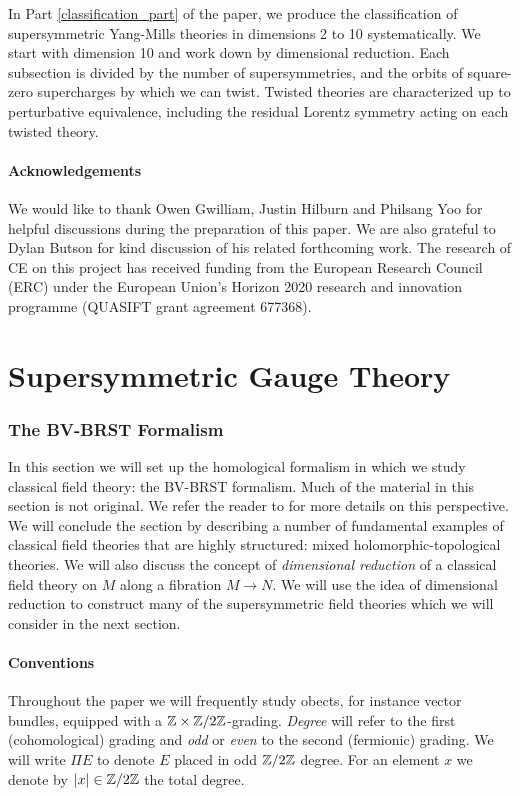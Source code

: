 \documentclass[10pt, oneside]{article}
\begin{document}
In Part \ref{classification_part} of the paper, we produce the classification of supersymmetric Yang-Mills theories in dimensions 2 to 10 systematically.  We start with dimension 10 and work down by dimensional reduction.  Each subsection is divided by the number of supersymmetries, and the orbits of square-zero supercharges by which we can twist.  Twisted theories are characterized up to perturbative equivalence, including the residual Lorentz symmetry acting on each twisted theory.

\subsection*{Acknowledgements}
We would like to thank Owen Gwilliam, Justin Hilburn and Philsang Yoo for helpful discussions during the preparation of this paper.  We are also grateful to Dylan Butson for kind discussion of his related forthcoming work.  The research of CE on this project has received funding from the European Research Council (ERC) under the European Union's Horizon 2020 research and innovation programme (QUASIFT grant agreement 677368).

\pagestyle{standard}
\part{Supersymmetric Gauge Theory} \label{formalism_part}

\section{The BV-BRST Formalism} \label{BV_section}

In this section we will set up the homological formalism in which we study classical field theory: the BV-BRST formalism.  Much of the material in this section is not original.  We refer the reader to \cite{CostelloBook, Book2} for more details on this perspective.  We will conclude the section by describing a number of fundamental examples of classical field theories that are highly structured: mixed holomorphic-topological theories.  We will also discuss the concept of \emph{dimensional reduction} of a classical field theory on $M$ along a fibration $M \to N$.  We will use the idea of dimensional reduction to construct many of the supersymmetric field theories which we will consider in the next section.  

\subsection{Conventions}
Throughout the paper we will frequently study obects, for instance vector bundles, equipped with a $\mathbb Z\times\mathbb Z/2\mathbb Z$-grading. \emph{Degree} will refer to the first (cohomological) grading and \emph{odd} or \emph{even} to the second (fermionic) grading.  We will write $\Pi E$ to denote $E$ placed in odd $\mathbb Z/2\mathbb Z$ degree.  For an element $x$ we denote by $|x|\in\mathbb Z/2\mathbb Z$ the total degree.
\end{document}
